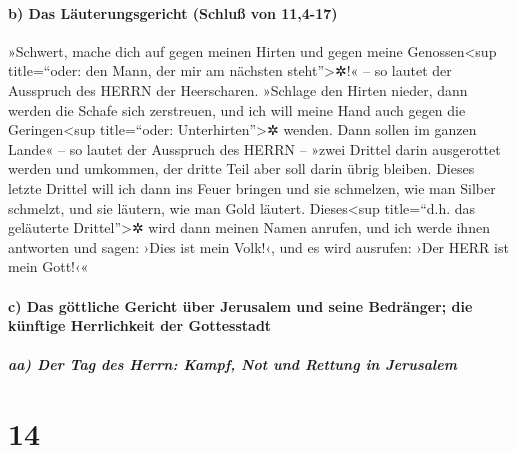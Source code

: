 \hypertarget{b-das-luxe4uterungsgericht-schluuxdf-von-114-17}{%
\paragraph{b) Das Läuterungsgericht (Schluß von
11,4-17)}\label{b-das-luxe4uterungsgericht-schluuxdf-von-114-17}}

 »Schwert, mache dich auf gegen meinen Hirten und gegen
meine Genossen\textless sup title=``oder: den Mann, der mir am nächsten
steht''\textgreater✲!« -- so lautet der Ausspruch des HERRN der
Heerscharen. »Schlage den Hirten nieder, dann werden die Schafe sich
zerstreuen, und ich will meine Hand auch gegen die Geringen\textless sup
title=``oder: Unterhirten''\textgreater✲ wenden.  Dann
sollen im ganzen Lande« -- so lautet der Ausspruch des HERRN -- »zwei
Drittel darin ausgerottet werden und umkommen, der dritte Teil aber soll
darin übrig bleiben.  Dieses letzte Drittel will ich dann
ins Feuer bringen und sie schmelzen, wie man Silber schmelzt, und sie
läutern, wie man Gold läutert. Dieses\textless sup title=``d.h. das
geläuterte Drittel''\textgreater✲ wird dann meinen Namen anrufen, und
ich werde ihnen antworten und sagen: ›Dies ist mein Volk!‹, und es wird
ausrufen: ›Der HERR ist mein Gott!‹«

\hypertarget{c-das-guxf6ttliche-gericht-uxfcber-jerusalem-und-seine-bedruxe4nger-die-kuxfcnftige-herrlichkeit-der-gottesstadt}{%
\paragraph{c) Das göttliche Gericht über Jerusalem und seine Bedränger;
die künftige Herrlichkeit der
Gottesstadt}\label{c-das-guxf6ttliche-gericht-uxfcber-jerusalem-und-seine-bedruxe4nger-die-kuxfcnftige-herrlichkeit-der-gottesstadt}}

\hypertarget{aa-der-tag-des-herrn-kampf-not-und-rettung-in-jerusalem}{%
\subparagraph{aa) Der Tag des Herrn: Kampf, Not und Rettung in
Jerusalem}\label{aa-der-tag-des-herrn-kampf-not-und-rettung-in-jerusalem}}

\hypertarget{section-13}{%
\section{14}\label{section-13}}

